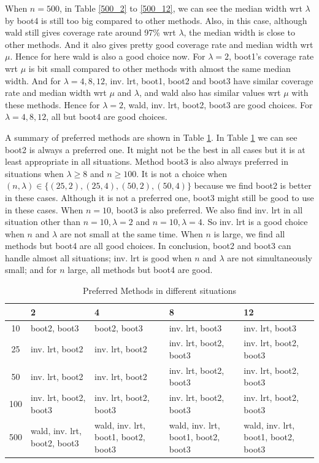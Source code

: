 \documentclass{article}
\begin{document}
	When $n = 500$, in Table \ref{500_2} to \ref{500_12}, we can see the median width wrt $\lambda$ by boot4 is still too big compared to other methods. Also, in this case, although wald still gives coverage rate around 97\% wrt $\lambda$, the median width is close to other methods. And it also gives pretty good coverage rate and median width wrt $\mu$. Hence for here wald is also a good choice now. For $\lambda = 2$, boot1's coverage rate wrt $\mu$ is bit small compared to other methods with almost the same median width. And for $\lambda = 4, 8, 12$, inv. lrt, boot1, boot2 and boot3 have similar coverage rate and median width wrt $\mu$ and $\lambda$, and wald also has similar values wrt $\mu$ with these methods. Hence for $\lambda = 2$, wald, inv. lrt, boot2, boot3 are good choices. For $\lambda = 4, 8, 12$, all but boot4 are good choices.

	A summary of preferred methods are shown in Table \ref{preffered}. In Table \ref{preffered} we can see boot2 is always a preferred one. It might not be the best in all cases but it is at least appropriate in all situations. Method boot3 is also always preferred in situations when $\lambda \geq 8$ and $n \geq 100$. It is not a choice when $(n, \lambda) \in \{(25, 2), (25, 4), (50, 2), (50, 4)\}$ because we find boot2 is better in these cases. Although it is not a preferred one, boot3 might still be good to use in these cases. When $n = 10$, boot3 is also preferred. We also find inv. lrt in all situation other than $n=10, \lambda = 2$ and $n = 10, \lambda = 4$. So inv. lrt is a good choice when $n$ and $\lambda$ are not small at the same time. When $n$ is large, we find all methods but boot4 are all good choices. In conclusion, boot2 and boot3 can handle almost all situations; inv. lrt is good when $n$ and $\lambda$ are not simultaneously small; and for $n$ large, all methods but boot4 are good.

	\begin{table}[!htb]
	\caption{Preferred Methods in different situations}
	\label{preffered}
	\begin{tabularx}{\textwidth}{|c|X|X|X|X|}
	\hline
	 \diagbox{$\lambda$}{$n$}& 2 & 4 & 8 & 12\\ \hline
	 10 & boot2, boot3 & boot2, boot3 & inv. lrt, boot3 & inv. lrt, boot3\\ \hline
	 25 &  inv. lrt, boot2 & inv. lrt, boot2 & inv. lrt, boot2, boot3 & inv. lrt, boot2, boot3\\\hline
	 50 &  inv. lrt, boot2 & inv. lrt, boot2 & inv. lrt, boot2, boot3 & inv. lrt, boot2, boot3\\\hline
	 100 & inv. lrt, boot2, boot3 & inv. lrt, boot2, boot3 & inv. lrt, boot2, boot3 & inv. lrt, boot2, boot3 \\ \hline
	 500 & wald, inv. lrt, boot2, boot3 & wald, inv. lrt, boot1, boot2, boot3 & wald, inv. lrt, boot1, boot2, boot3 & wald, inv. lrt, boot1, boot2, boot3\\ \hline
	\end{tabularx}
	\end{table}	
\end{document}
